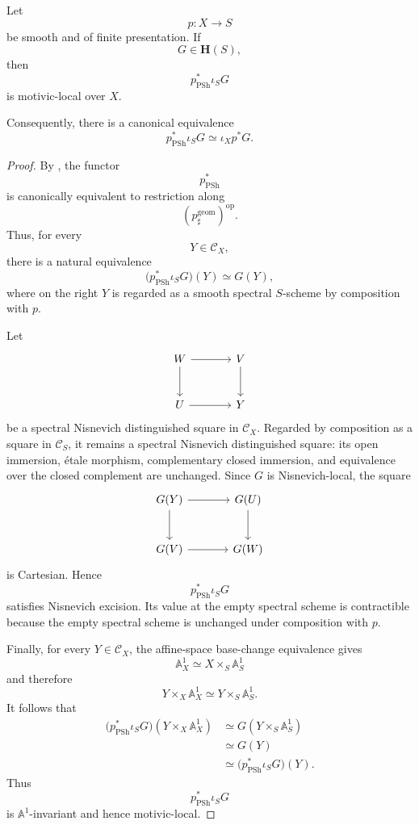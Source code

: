 \begin{proposition}
\label{prop:smooth-presheaf-inverse-image-preserves-local}
Let
\[
    p
    \colon
    X
    \longrightarrow
    S
\]
be smooth and of finite presentation. If
\[
    G
    \in
    \mathbf H(S),
\]
then
\[
    p^*_{\operatorname{PSh}}\iota_SG
\]
is motivic-local over \(X\).

Consequently, there is a canonical equivalence
\[
    p^*_{\operatorname{PSh}}\iota_SG
    \simeq
    \iota_Xp^*G.
\]
\end{proposition}

\begin{proof}
By
,
the functor
\[
    p^*_{\operatorname{PSh}}
\]
is canonically equivalent to restriction along
\[
    (p^{\mathrm{geom}}_\sharp)^{\mathrm{op}}.
\]
Thus, for every
\[
    Y
    \in
    \mathcal C_X,
\]
there is a natural equivalence
\[
    \bigl(
        p^*_{\operatorname{PSh}}\iota_SG
    \bigr)(Y)
    \simeq
    G(Y),
\]
where on the right \(Y\) is regarded as a smooth spectral \(S\)-scheme
by composition with \(p\).

Let
\[
\begin{tikzcd}[column sep=large, row sep=large]
    W
        \arrow[r]
        \arrow[d]
    &
    V
        \arrow[d]
    \\
    U
        \arrow[r]
    &
    Y
\end{tikzcd}
\]
be a spectral Nisnevich distinguished square in \(\mathcal C_X\).
Regarded by composition as a square in \(\mathcal C_S\), it remains a
spectral Nisnevich distinguished square: its open immersion, étale
morphism, complementary closed immersion, and equivalence over the
closed complement are unchanged. Since \(G\) is Nisnevich-local, the
square
\[
\begin{tikzcd}[column sep=large, row sep=large]
    G(Y)
        \arrow[r]
        \arrow[d]
    &
    G(U)
        \arrow[d]
    \\
    G(V)
        \arrow[r]
    &
    G(W)
\end{tikzcd}
\]
is Cartesian. Hence
\[
    p^*_{\operatorname{PSh}}\iota_SG
\]
satisfies Nisnevich excision. Its value at the empty spectral scheme is
contractible because the empty spectral scheme is unchanged under
composition with \(p\).

Finally, for every \(Y\in\mathcal C_X\), the affine-space base-change
equivalence gives
\[
    \mathbb A^1_X
    \simeq
    X\times_S\mathbb A^1_S
\]
and therefore
\[
    Y\times_X\mathbb A^1_X
    \simeq
    Y\times_S\mathbb A^1_S.
\]
It follows that
\[
\begin{aligned}
    \bigl(
        p^*_{\operatorname{PSh}}\iota_SG
    \bigr)
    (Y\times_X\mathbb A^1_X)
    &\simeq
    G(Y\times_S\mathbb A^1_S)
    \\
    &\simeq
    G(Y)
    \\
    &\simeq
    \bigl(
        p^*_{\operatorname{PSh}}\iota_SG
    \bigr)(Y).
\end{aligned}
\]
Thus
\[
    p^*_{\operatorname{PSh}}\iota_SG
\]
is \(\mathbb A^1\)-invariant and hence motivic-local.


\end{proof}
